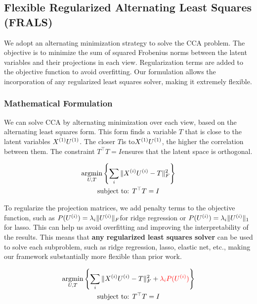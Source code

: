 \subsection{Flexible Regularized Alternating Least Squares (FRALS)}\label{subsec:flexible-regularized-alternating-least
-squares-(frals)}

We adopt an alternating minimization strategy to solve the CCA problem.
The objective is to minimize the sum of squared Frobenius norms between the latent variables and their projections in each view.
Regularization terms are added to the objective function to avoid overfitting.
Our formulation allows the incorporation of any regularized least squares solver, making it extremely flexible.

\subsubsection{Mathematical Formulation}
We can solve CCA by alternating minimization over each view, based on the alternating least squares form.
This form finds a variable \( T \) that is close to the latent variables \( X^{(1)} U^{(1)} \).
The closer \( T \)is to\( X^{(1)} U^{(1)} \), the higher the correlation between them.
The constraint \( T^\top T = I \)ensures that the latent space is orthogonal.

\begin{gather*}
    \underset{U, T}{\mathrm{argmin}}\left\{\sum_i \|X^{(i)} U^{(i)} - T\|_F^2 \right\}\\
    \text{subject to: }T^\top T = I\\
\end{gather*}

To regularize the projection matrices, we add penalty terms to the objective function, such as \( P(U^{(i)}) = \lambda_i \|U^{(i)}\|_F \)for ridge regression or \( P(U^{(i)}) = \lambda_i \|U^{(i)}\|_1 \) for lasso.
This can help us avoid overfitting and improving the interpretability of the results.
This means that \textbf{any regularized least squares solver} can be used to solve each subproblem, such as ridge regression, lasso, elastic net, etc., making our framework substantially more flexible than prior work.

\begin{gather*}
    \underset{U, T}{\mathrm{argmin}}\left\{\sum_i \|X^{(i)} U^{(i)} - T\|_F^2 + \textcolor{red}{\lambda_i P(U^{(i)})}\right\}\\
    \text{subject to: }T^\top T = I\\
\end{gather*}

